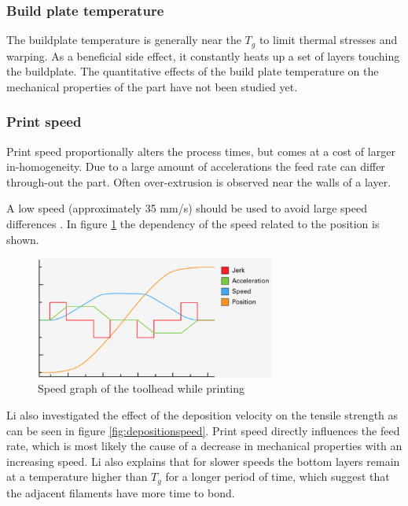 \subsubsection {Build plate temperature }
 The buildplate temperature is generally near the $T_g$ to limit thermal stresses and warping. As a beneficial side effect, it constantly heats up a set of layers touching the buildplate.
The quantitative effects of the build plate temperature on the mechanical properties of the part have not been studied yet. 

\subsubsection {Print speed }
Print speed proportionally alters the process times,  but comes at a cost of larger in-homogeneity. Due to a large amount of accelerations the feed rate can differ through-out the part. Often over-extrusion is observed near the walls of a layer.

A low speed (approximately 35 mm/s) should be used to avoid large speed differences \cite{Li2017TheProperties}.  In figure \ref{fig:speedgraph} the dependency of the speed related to the position is shown.

\begin{figure}[htb]
    \centering
    \includegraphics[width=0.7\textwidth]{chapter_2/figures/Speedgraph.PNG}
    \caption{Speed graph of the toolhead while printing \cite{UltimakerSpeed}}
    \label{fig:speedgraph}
\end{figure}

Li \cite{Li2017TheProperties} also investigated the effect of the deposition velocity on the tensile strength as can be seen in figure \ref{fig:depositionspeed}. Print speed directly influences the feed rate, which is most likely the cause of a decrease in mechanical properties with an increasing speed. Li also explains that for slower speeds the bottom layers remain at a temperature higher than $T_g$ for a longer period of time, which suggest that the adjacent filaments have more time to bond.

